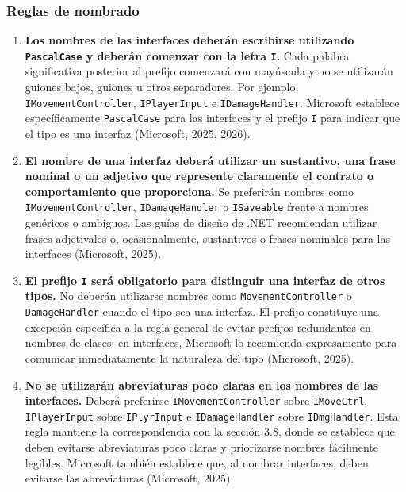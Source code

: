 
\subsubsection{Reglas de nombrado}

\begin{enumerate}

\item \textbf{Los nombres de las interfaces deberán escribirse utilizando \texttt{PascalCase} y deberán comenzar con la letra \texttt{I}.} Cada palabra significativa posterior al prefijo comenzará con mayúscula y no se utilizarán guiones bajos, guiones u otros separadores. Por ejemplo, \texttt{IMovementController}, \texttt{IPlayerInput} e \texttt{IDamageHandler}. Microsoft establece específicamente \texttt{PascalCase} para las interfaces y el prefijo \texttt{I} para indicar que el tipo es una interfaz (Microsoft, 2025, 2026).

\item \textbf{El nombre de una interfaz deberá utilizar un sustantivo, una frase nominal o un adjetivo que represente claramente el contrato o comportamiento que proporciona.} Se preferirán nombres como \texttt{IMovementController}, \texttt{IDamageHandler} o \texttt{ISaveable} frente a nombres genéricos o ambiguos. Las guías de diseño de .NET recomiendan utilizar frases adjetivales o, ocasionalmente, sustantivos o frases nominales para las interfaces (Microsoft, 2025).

\item \textbf{El prefijo \texttt{I} será obligatorio para distinguir una interfaz de otros tipos.} No deberán utilizarse nombres como \texttt{MovementController} o \texttt{DamageHandler} cuando el tipo sea una interfaz. El prefijo constituye una excepción específica a la regla general de evitar prefijos redundantes en nombres de clases: en interfaces, Microsoft lo recomienda expresamente para comunicar inmediatamente la naturaleza del tipo (Microsoft, 2025).

\item \textbf{No se utilizarán abreviaturas poco claras en los nombres de las interfaces.} Deberá preferirse \texttt{IMovementController} sobre \texttt{IMoveCtrl}, \texttt{IPlayerInput} sobre \texttt{IPlyrInput} e \texttt{IDamageHandler} sobre \texttt{IDmgHandler}. Esta regla mantiene la correspondencia con la sección 3.8, donde se establece que deben evitarse abreviaturas poco claras y priorizarse nombres fácilmente legibles. Microsoft también establece que, al nombrar interfaces, deben evitarse las abreviaturas (Microsoft, 2025).


\end{enumerate}
